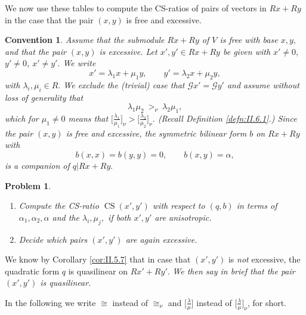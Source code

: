 \documentclass [12pt,a4paper,reqno]{amsart}
\newtheorem{convention}[thm]{Convention}
\newtheorem{problem}[thm]{Problem}
\begin{document}
We now use these tables to compute the CS-ratios of pairs of vectors in $R x+ R y$ in the case that the pair $(x,y)$ is free and excessive.

\begin{convention}\label{conv:II.7.8}
Assume that the submodule $R x + R y$ of $V$ is free with base $x,y,$ and that the pair $(x,y)$  is excessive. Let $x' , y' \in Rx + Ry$ be given with $x' \neq 0,$ $y' \neq 0$, $x' \neq y'.$  We write
\begin{equation}\label{eq:II.7.13}
x' = {\lambda}_1 x + \mu_1 y, \qquad y' = {\lambda}_2 x + \mu_2 y,
\end{equation}
with ${\lambda}_i, \mu_i \in R.$ We
exclude the (trivial) case that ${\mathcal G} x' = {\mathcal G} y'$ and
assume without loss of generality that
\begin{equation}\label{eq:II.7.14}
{\lambda}_1 \mu_2  {\ {{>_\nu}} \ } {\lambda}_2 \mu_1,
\end{equation}
which for  $\mu_1 \neq 0$ means that $\big[\frac{{\lambda}_1}{\mu_1}\big]_\nu > \big[\frac{{\lambda}_2}{\mu_2}\big]_\nu$. (Recall Definition \ref{defn:II.6.1}.)
Since  the pair $(x,y)$ is free and excessive, the symmetric bilinear form $b$ on $Rx + Ry$ with
\begin{equation}\label{eq:II.7.15}
b(x,x) = b(y,y) = 0, \qquad b(x,y) = {\alpha},
\end{equation}
is a companion of $q | Rx + Ry.$
\end{convention}

\begin{problem}\label{prob:II.7.9} $ $
\begin{enumerate}
  \item[a)] Compute the CS-ratio ${\operatorname{CS}}(x',y')$ with respect to $(q,b)$ in terms of ${\alpha}_1, {\alpha}_2, {\alpha}$ and the ${\lambda}_i, \mu_j,$ if both $x',y'$ are anisotropic. {\vskip 1.5mm \noindent}

  \item[b)] Decide which pairs $(x',y' )$ are again excessive.
\end{enumerate}
\end{problem}

We know by Corollary \ref{cor:II.5.7} that in case that $(x',y')$ is \emph{not} excessive, the quadratic  form $q$  is quasilinear on $Rx' + Ry'.$  \emph{We then  say in brief that the pair $(x', y')$ is quasilinear.}

In the following we write $\cong$ instead of $\cong_\nu$ and $\big[\frac{\lambda}{\mu} \big]$ instead of $\big[\frac{\lambda}{\mu} \big]_\nu$, for short.
\end{document}
